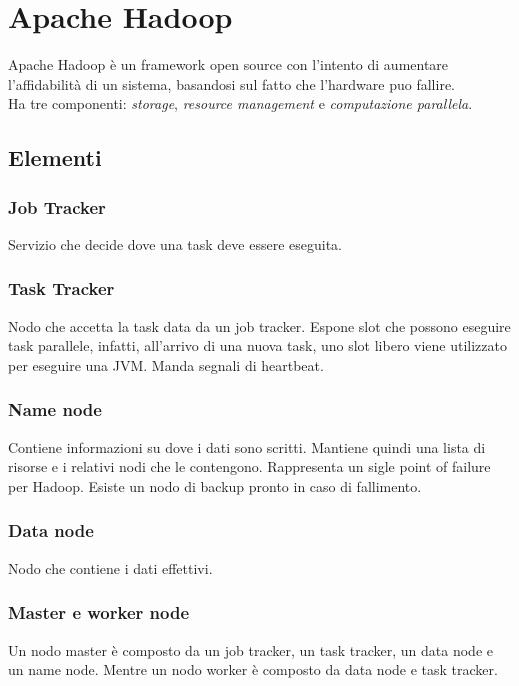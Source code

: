 \section{Apache Hadoop}
Apache Hadoop è un framework open source con l'intento di aumentare l'affidabilità di un sistema, basandosi sul fatto che l'hardware puo fallire.
\\Ha tre componenti: \emph{storage}, \emph{resource management} e \emph{computazione parallela}.

\subsection{Elementi}

\subsubsection{Job Tracker}
Servizio che decide dove una task deve essere eseguita.

\subsubsection{Task Tracker}
Nodo che accetta la task data da un job tracker. Espone slot che possono eseguire
task parallele, infatti, all'arrivo di una nuova task, uno slot libero viene utilizzato per eseguire una JVM. Manda segnali di heartbeat.

\subsubsection{Name node}
Contiene informazioni su dove i dati sono scritti. Mantiene quindi una lista 
di risorse e i relativi nodi che le contengono. Rappresenta un sigle point of failure
per Hadoop. Esiste un nodo di backup pronto in caso di fallimento.

\subsubsection{Data node}
Nodo che contiene i dati effettivi.

\subsubsection{Master e worker node}
Un nodo master è composto da un job tracker, un task tracker, un data node e un name node. Mentre un nodo worker è composto da data node e task tracker.

